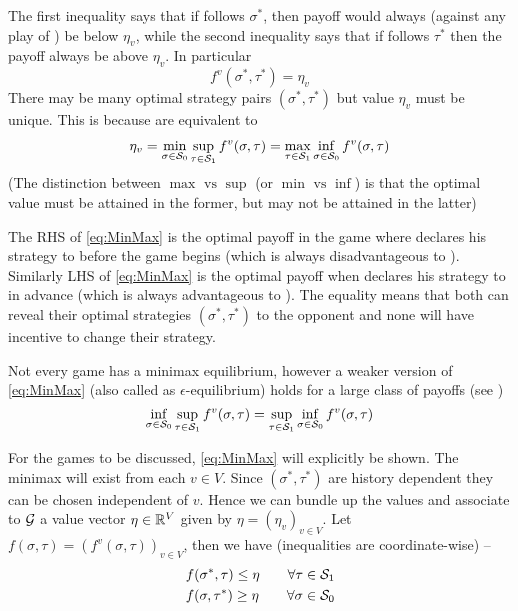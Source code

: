 The first inequality says that if  follows $\sigma^*$, then payoff would always (against any play of ) be below $\eta_v$, while the second inequality says that if  follows $\tau^*$ then the payoff always be above $\eta_v$. In particular
\[
    f^v(\sigma^*,\tau^*) = \eta_v
\]
There may be many optimal strategy pairs $(\sigma^*,\tau^*)$ but value $\eta_v$ must be unique. This is because
\eqminmax are equivalent to
\begin{align}
    \eta_v = \min_{\sigma \in \mathcal{S}_0} \sup_{\tau \in \mathcal{S}_1} f^v(\sigma, \tau) = \max_{\tau \in \mathcal{S}_1} \inf_{\sigma \in \mathcal{S}_0 } f^v(\sigma,\tau) \label{eq:MinMax}
\end{align}
(The distinction between $\max \text{ vs } \sup$ (or $\min \text{ vs } \inf$) is that the optimal value must be attained in the former, but may not be attained in the latter)

The RHS of \eqref{eq:MinMax} is the optimal payoff in the game where  declares his strategy to  before the game begins (which is always disadvantageous to ). Similarly LHS of \eqref{eq:MinMax} is the optimal payoff when  declares his strategy to  in advance (which is always advantageous to ). The equality means that both can reveal their optimal strategies $(\sigma^*,\tau^*)$ to the opponent and none will have incentive to change their strategy.

Not every game has a minimax equilibrium, however a weaker version of \eqref{eq:MinMax} (also called as $\epsilon$-equilibrium) holds for a large class of payoffs (see  \cite{roux_equilibria})
\[
    \inf_{\sigma \in \mathcal{S}_0} \sup_{\tau \in \mathcal{S}_1} f^v(\sigma, \tau) = \sup_{\tau \in \mathcal{S}_1} \inf_{\sigma \in \mathcal{S}_0 } f^v(\sigma,\tau)
\]

For the games to be discussed, \eqref{eq:MinMax} will explicitly be shown. The minimax will exist from each $v \in V$.  Since $(\sigma^*,\tau^*)$ are history dependent they can be chosen independent of $v$. Hence we can bundle up the values and associate to $\mathcal{G}$ a value vector $\eta \in \mathbb{R}^V$ given by $\eta = (\eta_v)_{v\in V}$. Let $f(\sigma,\tau) = (f^v(\sigma,\tau))_{v \in V}$, then we have (inequalities are coordinate-wise) --
\begin{equation}
    \begin{aligned}
    f(\sigma^*, \tau) \leq \eta \qquad \forall \tau \in \mathcal{S}_1\\
    f(\sigma,\tau^*) \geq \eta \qquad \forall \sigma \in \mathcal{S}_0
    \end{aligned}\label{eq:vecMinMax}
\end{equation}

